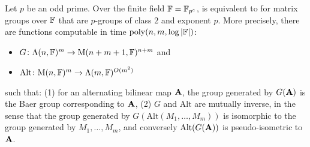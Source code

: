 \documentclass[11pt]{article}
\begin{document}
\begin{lemma} \label{lem:baer_matrix}
Let $p$ be an odd prime. Over the finite field $\mathbb{F}=\mathbb{F}_{p^e}$, \AltMatSpIsomlong is 
equivalent to \GpIlong for matrix groups over $\mathbb{F}$ that are $p$-groups of class $2$ and exponent $p$. More precisely, there are functions computable in time $\mathrm{poly}(n,m,\log|\mathbb{F}|)$:
\begin{itemize}
\item $G\colon \Lambda(n,\mathbb{F})^m \to \mathrm{M}(n+m+1,\mathbb{F})^{n+m}$ and
\item $\text{Alt} \colon \mathrm{M}(n,\mathbb{F})^m \to \Lambda(m, \mathbb{F})^{O(m^2)}$ 
\end{itemize}
such that: (1) for an alternating bilinear map $\mathbf{A}$, the group generated by $G(\mathbf{A})$ is the Baer group corresponding to $\mathbf{A}$, (2) $G$ and $\text{Alt}$ are mutually inverse, in the sense that the group generated by $G(\text{Alt}(M_1, \dotsc, M_m))$ is isomorphic to the group generated by $M_1, \dotsc, M_m$, and conversely $\text{Alt}(G(\mathbf{A}))$ is pseudo-isometric to $\mathbf{A}$.
\end{lemma}
\end{document}
